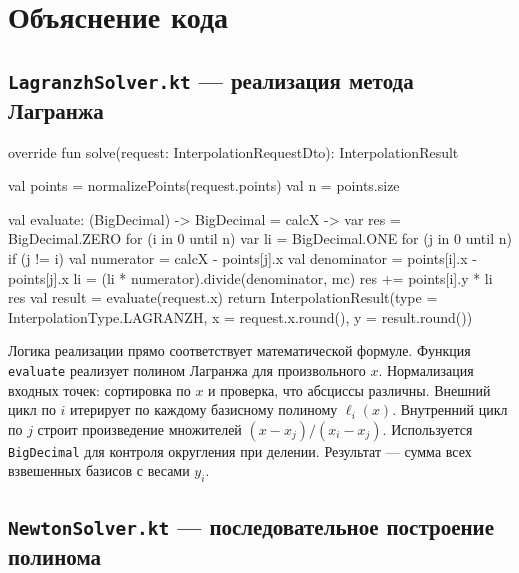 \documentclass[12pt,a4paper]{article}
\begin{document}
\section{Объяснение кода}

\subsection{\texttt{LagranzhSolver.kt} --- реализация метода Лагранжа}

\begin{codebox}
override fun solve(request: InterpolationRequestDto): InterpolationResult {
    val points = normalizePoints(request.points)
    val n = points.size

    val evaluate: (BigDecimal) -> BigDecimal = { calcX ->
        var res = BigDecimal.ZERO
        for (i in 0 until n) {
            var li = BigDecimal.ONE
            for (j in 0 until n) {
                if (j != i) {
                    val numerator = calcX - points[j].x
                    val denominator = points[i].x - points[j].x
                    li = (li * numerator).divide(denominator, mc)
                }
            }
            res += points[i].y * li
        }
        res
    }
    val result = evaluate(request.x)
    return InterpolationResult(type = InterpolationType.LAGRANZH, x = request.x.round(), y = result.round())
}
\end{codebox}

Логика реализации прямо соответствует математической формуле. Функция \texttt{evaluate} реализует полином Лагранжа для произвольного $x$. Нормализация входных точек: сортировка по $x$ и проверка, что абсциссы различны. Внешний цикл по $i$ итерирует по каждому базисному полиному $\ell_i(x)$. Внутренний цикл по $j$ строит произведение множителей $(x-x_j)/(x_i-x_j)$. Используется \texttt{BigDecimal} для контроля округления при делении. Результат --- сумма всех взвешенных базисов с весами $y_i$.

\subsection{\texttt{NewtonSolver.kt} --- последовательное построение полинома}
\end{document}
